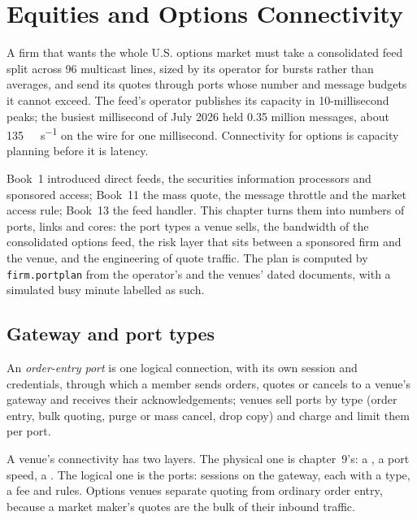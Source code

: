 \chapter{Equities and Options Connectivity}\label{ch:nw:equities-and-options-connectivity}

A firm that wants the whole U.S. options market must take a consolidated feed split across 96 multicast lines, sized by its
operator for bursts rather than averages, and send its quotes through ports whose number and message budgets it cannot
exceed. The feed's operator publishes its capacity in 10-millisecond peaks; the busiest millisecond of July 2026 held 0.35
million messages, about \qty{135}{\giga\bit\per\second} on the wire for one millisecond. Connectivity for options is capacity
planning before it is latency.

Book~1 introduced direct feeds, the securities information processors and sponsored access; Book~11 the mass quote, the
message throttle and the market access rule; Book~13 the feed handler. This chapter turns them into numbers of ports,
links and cores: the port types a venue sells, the bandwidth of the consolidated options feed, the risk layer that sits
between a sponsored firm and the venue, and the engineering of quote traffic. The plan is computed by \texttt{firm.portplan}
from the operator's and the venues' dated documents, with a simulated busy minute labelled as such.

\section{Gateway and port types}

\begin{definition}\label{def:nw:equities-and-options-connectivity:port}
An \emph{order-entry port} is one logical connection, with its own session and credentials, through
which a member sends orders, quotes or cancels to a venue's gateway and receives their acknowledgements; venues sell
ports by type (order entry, bulk quoting, purge or mass cancel, drop copy) and charge and limit them per port.
\end{definition}

A venue's connectivity has two layers. The physical one is chapter~9's: a , a port speed, a . The logical one is the ports: sessions on the gateway, each with a type, a fee and rules. Options venues
separate quoting from ordinary order entry, because a market maker's quotes are the bulk of their inbound traffic.

